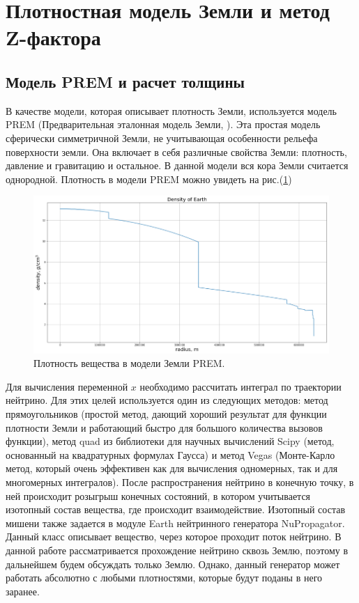 \section{Плотностная модель Земли и метод Z-фактора}
\subsection{Модель PREM и расчет толщины}
В качестве модели, которая описывает плотность Земли, используется модель PREM (Предварительная эталонная модель Земли, \cite{dziewonskiPREM1981}). Эта простая модель сферически симметричной Земли, не учитывающая особенности рельефа поверхности земли.  Она включает в себя различные свойства Земли: плотность, давление и гравитацию и остальное.  В данной модели вся кора Земли считается однородной.  Плотность в модели PREM можно увидеть на рис.(\ref{PREM})
\begin{figure}[!h]
\centering
\includegraphics[width=\linewidth]{images/NuProp/PREM.png}
\caption{Плотность вещества в модели Земли PREM.}
\label{PREM}
\end{figure}


Для вычисления переменной $x$ необходимо рассчитать интеграл по траектории нейтрино. Для этих целей используется один из следующих методов: метод прямоугольников (простой метод, дающий хороший результат для функции плотности Земли и работающий быстро для большого количества вызовов функции), метод quad из библиотеки для научных вычислений Scipy (метод, основанный на квадратурных формулах Гаусса) и метод Vegas (Монте-Карло метод, который очень эффективен как для вычисления одномерных, так и для многомерных интегралов). После распространения нейтрино в конечную точку, в ней происходит розыгрыш конечных состояний, в котором учитывается изотопный состав вещества, где происходит взаимодействие. Изотопный состав мишени также задается в модуле Earth нейтринного генератора NuPropagator. 
Данный класс описывает вещество, через которое проходит поток нейтрино. В данной работе рассматривается прохождение нейтрино сквозь Землю, поэтому в дальнейшем будем обсуждать только Землю. Однако, данный генератор может работать абсолютно с любыми плотностями, которые будут поданы в него заранее. 

